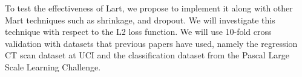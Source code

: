 \documentclass[]{scrartcl}
\begin{document}
To test the effectiveness of Lart, we propose to implement it along with other Mart techniques such as {shrinkage}\cite{sun2014convergence}, and {dropout}\cite{rashmi2015dart}. We will investigate this technique with respect to the L2 loss function. We will use 10-fold cross validation with datasets that previous papers have used, namely the regression CT scan dataset at UCI and the classification dataset  from the Pascal Large Scale Learning Challenge.




{}

\end{document}
